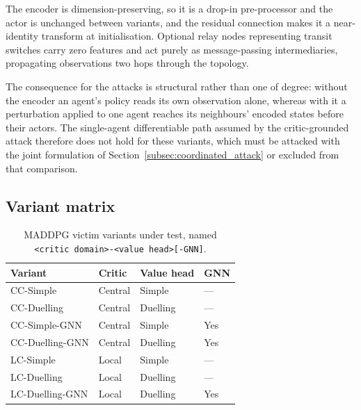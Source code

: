 \noindent The encoder is dimension-preserving, so it is a drop-in pre-processor and
the actor is unchanged between variants, and the residual connection makes it a
near-identity transform at initialisation. Optional relay nodes representing transit
switches carry zero features and act purely as message-passing intermediaries,
propagating observations two hops through the topology.

The consequence for the attacks is structural rather than one of degree: without the
encoder an agent's policy reads its own observation alone, whereas with it a
perturbation applied to one agent reaches its neighbours' encoded states before
their actors. The single-agent differentiable path assumed by the critic-grounded
attack therefore does not hold for these variants, which must be attacked with the
joint formulation of Section~\ref{subsec:coordinated_attack} or excluded from that
comparison.

\subsection{Variant matrix}
\label{subsec:variant_matrix}

\begin{table}[htbp]
  \centering
  \caption{MADDPG victim variants under test, named
           \texttt{<critic domain>-<value head>[-GNN]}.}
  \label{tab:variant_matrix}
  \begin{tabular}{llll}
    \hline
    \textbf{Variant} & \textbf{Critic} & \textbf{Value head} & \textbf{GNN} \\
    \hline
    CC-Simple        & Central & Simple   & --- \\
    CC-Duelling      & Central & Duelling & --- \\
    CC-Simple-GNN    & Central & Simple   & Yes \\
    CC-Duelling-GNN  & Central & Duelling & Yes \\
    \hline
    LC-Simple        & Local   & Simple   & --- \\
    LC-Duelling      & Local   & Duelling & --- \\
    LC-Duelling-GNN  & Local   & Duelling & Yes \\
    \hline
  \end{tabular}
\end{table}

